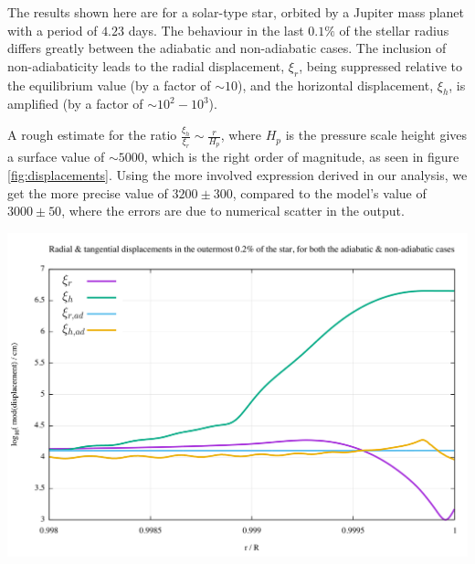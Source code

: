 \documentclass[a0,portrait]{a0poster}
\begin{document}
\begin{multicols}{2}
\begin{tcolorbox}[colframe=black,colback=blue!10!white]
The results shown here are for a solar-type star, orbited by a Jupiter mass planet with a period of $4.23$ days. The behaviour in the last $0.1\%$ of the stellar radius differs greatly between the adiabatic and non-adiabatic cases. The inclusion of non-adiabaticity leads to the radial displacement, $\xi_{r}$, being suppressed relative to the equilibrium value (by a factor of $\sim 10$), and the horizontal displacement, $\xi_{h}$, is amplified (by a factor of $\sim 10^{2} - 10^{3}$).

A rough estimate for the ratio $\frac{\xi_{h}}{\xi_{r}} \sim \frac{r}{H_{p}}$, where $H_{p}$ is the pressure scale height gives a surface value of $\sim 5000$, which is the right order of magnitude, as seen in figure \ref{fig:displacements}. Using the more involved expression derived in our analysis, we get the more precise value of $3200 \pm 300$, compared to the model's value of $3000 \pm 50$, where the errors are due to numerical scatter in the output.

\begin{center}\vspace{1cm}
\includegraphics[width=0.98\linewidth]{poster_mod_displacements_key}
\label{fig:displacements}
\end{center}\vspace{1cm}


\end{tcolorbox}
\end{multicols}
\end{document}
